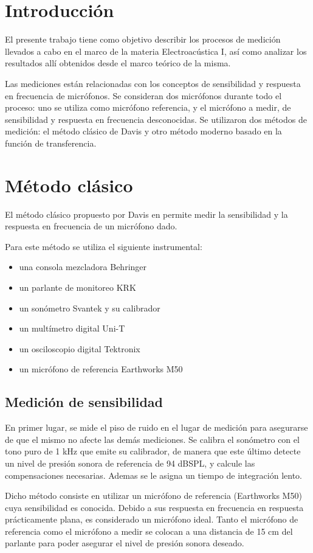 \documentclass[]{article}
\begin{document}
\begin{multicols}{2}
\section{Introducción}
El presente trabajo tiene como objetivo describir los procesos de medición
llevados a cabo en el marco de la materia Electroacústica I, así como analizar
los resultados allí obtenidos desde el marco teórico de la misma.

Las mediciones están relacionadas con los conceptos de sensibilidad y respuesta
 en frecuencia de micrófonos. Se consideran dos micrófonos durante todo el
proceso: uno se utiliza como micrófono referencia, y el micrófono a medir, de
sensibilidad y respuesta en frecuencia desconocidas. Se utilizaron dos métodos
de medición: el método clásico de Davis y otro método moderno basado en la
función de transferencia.
\section{Método clásico}
El método clásico propuesto por Davis en \cite{davis2006sound} permite medir
la sensibilidad y la respuesta en frecuencia de un micrófono dado.

Para este método se utiliza el siguiente instrumental:
\begin{itemize}
\item una consola mezcladora Behringer
\item un parlante de monitoreo KRK
\item un sonómetro Svantek y su calibrador
\item un multímetro digital Uni-T
\item un osciloscopio digital Tektronix
\item un micrófono de referencia Earthworks M50
\end{itemize}

\subsection{Medición de sensibilidad}
En primer lugar, se mide el piso de ruido en el lugar de medición para asegurarse
de que el mismo no afecte las demás mediciones. Se calibra el sonómetro con el
tono puro de 1 kHz que emite su calibrador, de manera que este último detecte un
nivel de presión sonora de referencia de 94 dBSPL, y calcule las compensaciones
necesarias. Ademas se le asigna un tiempo de integración lento.

Dicho método consiste en utilizar un micrófono de referencia (Earthworks M50)
cuya sensibilidad es conocida. Debido a sus respuesta en frecuencia en respuesta
prácticamente plana, es considerado un micrófono ideal. Tanto el micrófono de
referencia como el micrófono a medir se colocan a una distancia de 15 cm del
parlante para poder asegurar el nivel de presión sonora deseado.


\end{multicols}
\end{document}
